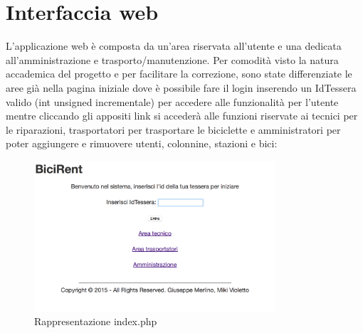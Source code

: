 \documentclass[a4paper,twoside]{article}
\begin{document}
\section{Interfaccia web}
L'applicazione web è composta da un'area riservata all'utente e una dedicata all'amministrazione e trasporto/manutenzione.
Per comodità visto la natura accademica del progetto e per facilitare la correzione, sono state differenziate le aree già nella pagina iniziale dove è possibile fare il login inserendo un IdTessera valido (int unsigned incrementale) per accedere alle funzionalità per l'utente mentre cliccando gli appositi link si accederà alle funzioni riservate ai tecnici per le riparazioni, trasportatori per trasportare le biciclette e amministratori per poter aggiungere e rimuovere utenti, colonnine, stazioni e bici: 
\begin{figure}[H]
	\centering
	\includegraphics[width=0.8\textwidth]{Screenshot01}
	\caption{Rappresentazione index.php}
\end{figure}
\end{document}
